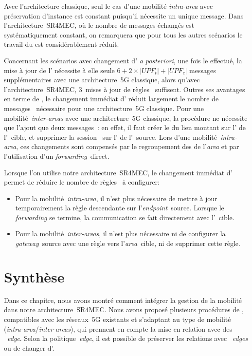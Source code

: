 \documentclass[../main.tex]{subfiles}
\begin{document}
Avec l’architecture classique, seul le cas d’une mobilité \textit{intra-area} avec préservation d’instance est constant puisqu’il nécessite un unique message.
Dans l’architecture~SR4MEC, où le nombre de messages échangés est systématiquement constant, on remarquera que pour tous les autres scénarios le travail du  est considérablement réduit.

Concernant les scénarios avec changement d’ \textit{a posteriori}, une fois le  effectué, la mise à jour de l’ nécessite à elle seule $6 + 2 \times |\mathit{UPF_t}| + |\mathit{UPF_c}|$ messages~ supplémentaires avec une architecture~5G classique, alors qu’avec l’architecture~SR4MEC, 3~mises à jour de règles~ suffisent.
Outres ses avantages en terme de , le changement immédiat d’ réduit largement le nombre de messages~ nécessaire pour une architecture~5G classique.
Pour une mobilité~\textit{inter-areas} avec une architecture~5G classique, la procédure ne nécessite que l’ajout que deux messages~: en effet, il faut créer le  du lien montant sur l’ de l’~cible, et supprimer la session~ sur l’ de l’~source.
Lors d’une mobilité~\textit{intra-area}, ces changements sont compensés par le regroupement des  de l’\textit{area} et par l’utilisation d’un \textit{forwarding}~direct.

Lorsque l’on utilise notre architecture~SR4MEC, le changement immédiat d’ permet de réduire le nombre de règles~ à configurer:
\begin{itemize}
    \item Pour la mobilité~\textit{intra-area}, il n’est plus nécessaire de mettre à jour temporairement la règle descendante sur l’\textit{endpoint}~source. Lorsque le \textit{forwarding} se termine, la communication se fait directement avec l’~cible.
    \item Pour la mobilité~\textit{inter-areas}, il n’est plus nécessaire ni de configurer la \textit{gateway}~source avec une règle vers l’\textit{area}~cible, ni de supprimer cette règle.
\end{itemize}

\section{Synthèse}
Dans ce chapitre, nous avons montré comment intégrer la gestion de la mobilité dans notre architecture~SR4MEC.
Nous avons proposé plusieurs procédures de , compatibles avec les réseaux~5G existants et s’adaptant au type de mobilité (\textit{intra-area}/\textit{inter-areas}), qui prennent en compte la mise en relation avec des ~\textit{edge}.
Selon la politique~\textit{edge}, il est possible de préserver les relations avec ~\textit{edges} ou de changer d’.
\end{document}
